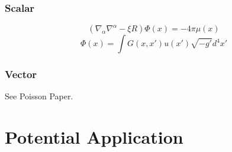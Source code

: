 \documentclass[10pt,letterpaper]{article}
\begin{document}
\subsubsection*{Scalar}
\begin{equation}
(\nabla_\alpha \nabla^\alpha - \xi R)\Phi(x) = -4\pi \mu(x)
\end{equation}
\begin{equation}
\Phi(x) = \int G(x,x')u(x')\sqrt{-g'}d^4x'
\end{equation}
\subsubsection*{Vector}
See Poisson Paper.
\newpage
\section{Potential Application}
\end{document}
